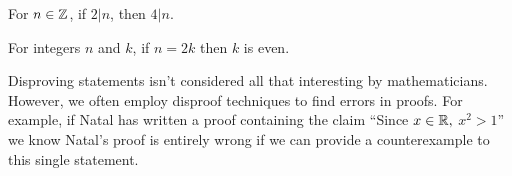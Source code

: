 \vspace{1in}

\begin{claim} For $n \in \mathbb{Z}$, if $2 |n$, then $4|n$.
\end{claim}

\vspace{1in}

\begin{claim} For integers $n$ and $k$, if $n=2k$ then $k$ is even.
\end{claim}

\vspace{1in}

Disproving statements isn't considered all that interesting by mathematicians.  However, we often employ disproof techniques to find errors in proofs.  For example, if Natal has written a proof containing the claim ``Since $x \in \mathbb{R},$ $x^2>1$'' we know Natal's proof is entirely wrong if we can provide a counterexample to this single statement.


